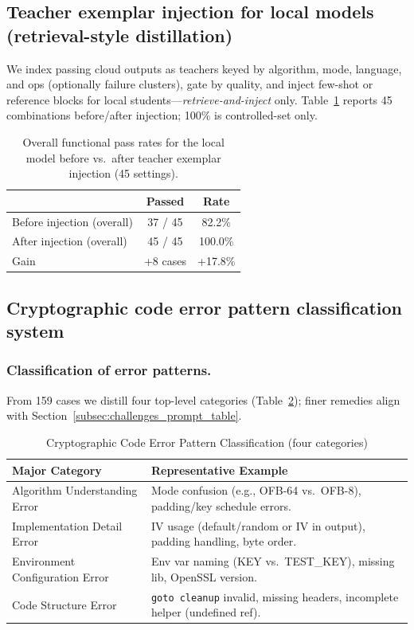 \documentclass[12pt]{llncs}
\begin{document}
\subsection{Teacher exemplar injection for local models (retrieval-style distillation)}
\label{subsec:distillation}
We index passing cloud outputs as teachers keyed by algorithm, mode, language, and ops (optionally failure clusters), gate by quality, and inject few-shot or reference blocks for local students---\emph{retrieve-and-inject} only. Table~\ref{tab:distillation_overall} reports 45 combinations before/after injection; 100\% is controlled-set only.
\begin{table}[H]
  \centering
  \footnotesize
  \caption{Overall functional pass rates for the local model before vs.\ after teacher exemplar injection (45 settings).}
  \label{tab:distillation_overall}
  \begin{tabular}{l c c}
    \toprule
    & Passed & Rate \\
    \midrule
    Before injection (overall) & 37 / 45 & 82.2\% \\
    After injection (overall) & 45 / 45 & 100.0\% \\
    Gain & +8 cases & +17.8\% \\
    \bottomrule
  \end{tabular}
\end{table}

\subsection{Cryptographic code error pattern classification system}
\subsubsection{Classification of error patterns.}
From 159 cases we distill four top-level categories (Table~\ref{tab:error_classification}); finer remedies align with Section~\ref{subsec:challenges_prompt_table}.
\begin{table}[htbp]
  \centering
  \footnotesize
  \caption{Cryptographic Code Error Pattern Classification (four categories)}
  \label{tab:error_classification}
  \setlength{\tabcolsep}{6pt}
  \begin{tabular}{p{}p{}}
    \toprule
    Major Category & Representative Example \\
    \midrule
    Algorithm Understanding Error & Mode confusion (e.g., OFB-64 vs.\ OFB-8), padding/key schedule errors. \\
    Implementation Detail Error & IV usage (default/random or IV in output), padding handling, byte order. \\
    Environment Configuration Error & Env var naming (KEY vs.\ TEST\_KEY), missing lib, OpenSSL version. \\
    Code Structure Error & \texttt{goto cleanup} invalid, missing headers, incomplete helper (undefined ref). \\
    \bottomrule
  \end{tabular}
\end{table}
\end{document}
